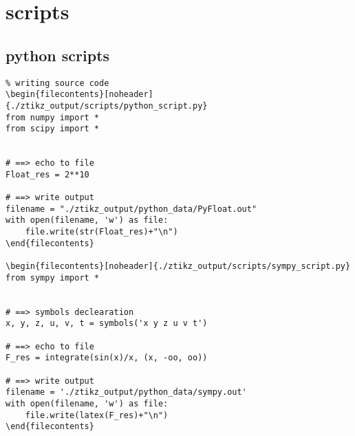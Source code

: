 \section{scripts}
\subsection{python scripts}
\begin{verbatim}
% writing source code
\begin{filecontents}[noheader]{./ztikz_output/scripts/python_script.py}
from numpy import *
from scipy import *


# ==> echo to file
Float_res = 2**10

# ==> write output
filename = "./ztikz_output/python_data/PyFloat.out"
with open(filename, 'w') as file: 
    file.write(str(Float_res)+"\n")
\end{filecontents}

\begin{filecontents}[noheader]{./ztikz_output/scripts/sympy_script.py}
from sympy import *


# ==> symbols declearation
x, y, z, u, v, t = symbols('x y z u v t') 

# ==> echo to file
F_res = integrate(sin(x)/x, (x, -oo, oo))

# ==> write output
filename = './ztikz_output/python_data/sympy.out'
with open(filename, 'w') as file: 
    file.write(latex(F_res)+"\n")
\end{filecontents}
\end{verbatim}

